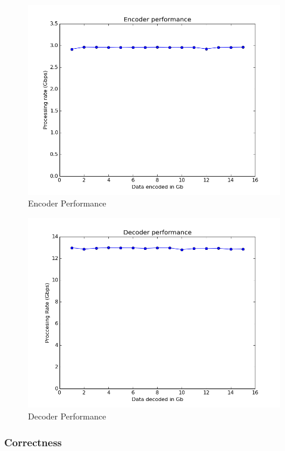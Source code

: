 \documentclass[conference]{IEEEtran}
\begin{document}
\begin{figure}[h]
  \centering
  \includegraphics[scale=0.45]{images/encoder_figure}
  \caption{Encoder Performance}
  \label{fig:encoder_performance}
\end{figure}

\begin{figure}[h]
  \centering
  \includegraphics[scale=0.45]{images/decoder_figure}
  \caption{Decoder Performance}
  \label{fig:decoder_performance}
\end{figure}

\subsubsection{Correctness}
\end{document}
